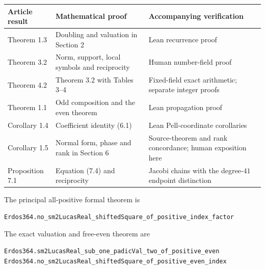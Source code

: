 \documentclass[11pt,a4paper]{article}
\newcounter{none}
\begin{document}
{\def\LTcaptype{none} %
\begin{longtable}[]{@{}
  >{\raggedright\arraybackslash}p{}
  >{\raggedright\arraybackslash}p{}
  >{\raggedright\arraybackslash}p{}@{}}
\toprule\noalign{}
\begin{minipage}[b]{\linewidth}\raggedright
Article result
\end{minipage} & \begin{minipage}[b]{\linewidth}\raggedright
Mathematical proof
\end{minipage} & \begin{minipage}[b]{\linewidth}\raggedright
Accompanying verification
\end{minipage} \\
\midrule\noalign{}
\endhead
\bottomrule\noalign{}
\endlastfoot
Theorem 1.3 & Doubling and valuation in Section 2 & Lean recurrence
proof \\
Theorem 3.2 & Norm, support, local symbols and reciprocity & Human
number-field proof \\
Theorem 4.2 & Theorem 3.2 with Tables 3--4 & Fixed-field exact
arithmetic; separate integer proofs \\
Theorem 1.1 & Odd composition and the even theorem & Lean propagation
proof \\
Corollary 1.4 & Coefficient identity (6.1) & Lean Pell-coordinate
corollaries \\
Corollary 1.5 & Normal form, phase and rank in Section 6 &
Source-theorem and rank concordance; human exposition here \\
Proposition 7.1 & Equation (7.4) and reciprocity & Jacobi chains with
the degree-\(41\) endpoint distinction \\
\end{longtable}
}

The principal all-positive formal theorem is

\begin{verbatim}
Erdos364.no_sm2LucasReal_shiftedSquare_of_positive_index_factor
\end{verbatim}

The exact valuation and free-even theorem are

\begin{verbatim}
Erdos364.sm2LucasReal_sub_one_padicVal_two_of_positive_even
Erdos364.no_sm2LucasReal_shiftedSquare_of_positive_even_index
\end{verbatim}
\end{document}
